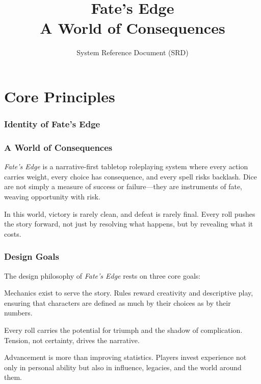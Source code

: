 \documentclass[12pt]{article}
\title{\Huge Fate's Edge \\[6pt] \Large A World of Consequences}
\author{System Reference Document (SRD)}
\date{}
\begin{document}
\maketitle
\tableofcontents
\newpage

\part{Core Principles}

\section{Identity of Fate's Edge}

\section{A World of Consequences}
\textit{Fate’s Edge} is a narrative-first tabletop roleplaying system where every action carries weight, every choice has consequence, and every spell risks backlash. Dice are not simply a measure of success or failure—they are instruments of fate, weaving opportunity with risk.  

In this world, victory is rarely clean, and defeat is rarely final. Every roll pushes the story forward, not just by resolving what happens, but by revealing what it costs.  

\section{Design Goals}
The design philosophy of \textit{Fate’s Edge} rests on three core goals:  

\begin{description}[leftmargin=2cm, style=nextline]
  \item[Narrative Primacy] Mechanics exist to serve the story. Rules reward creativity and descriptive play, ensuring that characters are defined as much by their choices as by their numbers.  
  \item[Risk as Drama] Every roll carries the potential for triumph and the shadow of complication. Tension, not certainty, drives the narrative.  
  \item[Meaningful Growth] Advancement is more than improving statistics. Players invest experience not only in personal ability but also in influence, legacies, and the world around them.  
\end{description}
\end{document}

